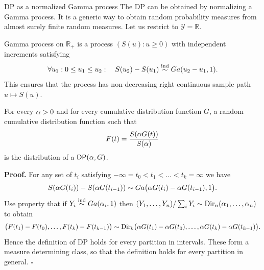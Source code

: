 \begin{frame}[allowframebreaks]{DP as a normalized Gamma process}
The DP can be obtained by \alert{normalizing a Gamma process}. It is a generic way to obtain random probability measures from almost surely finite random measures. Let us restrict to $\mathcal{Y}=\mathbb{R}$.
\begin{definition}
Gamma process on $\mathbb{R}_+$ is a process $(S(u):u \geq 0)$ with independent increments satisfying
\begin{equation*}
    \forall u_1: 0 \leq u_1 \leq u_2:\quad S(u_2) - S(u_1)\stackrel{\mbox{\scriptsize{ind}}}{\sim} Ga(u_2-u_1,1).
\end{equation*}
This ensures that the process has non-decreasing right continuous sample path $u\mapsto S(u)$.
\end{definition}

\begin{theorem}
For every $\alpha>0$ and for every cumulative distribution function $G$, a random cumulative distribution function such that
\begin{equation*}
    F(t) = \frac{S(\alpha G(t))}{S(\alpha)}
\end{equation*}
is the distribution of a $\mathsf{DP}(\alpha,G)$.
\end{theorem}

\textbf{Proof.}
For any set of $t_i$ satisfying $-\infty = t_0 < t_1 < \ldots < t_k = \infty$ we have 
$$
S(\alpha G(t_i)) - S(\alpha G(t_{i-1})) \sim Ga\big( \alpha G(t_i)-\alpha G(t_{i-1}),1\big).
$$
Use property that if $Y_i \stackrel{\mbox{\scriptsize{ind}}}{\sim} Ga(\alpha_i, 1)$ then $(Y_1, \ldots, Y_n)/\sum_i Y_i \sim \text{Dir}_n (\alpha_1,\ldots, \alpha_n)$ to obtain 
$$
\big(F(t_1)-F(t_0), \ldots, F(t_k) - F(t_{k-1}) \big) \sim \text{Dir}_k\big(\alpha G(t_1) -\alpha G(t_0), \ldots, \alpha G(t_k) -\alpha G(t_{k-1})\big).
$$
Hence the definition of DP holds for every partition in intervals. These form a measure determining class, so that the definition holds for every partition in general. \hfill $\square$

\end{frame}






